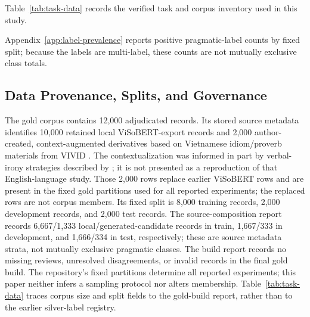 Table~\ref{tab:task-data} records the verified task and corpus inventory used in this study.
\begin{table}[t]
  \centering
  
  \caption{Verified ViPragSent task and data inventory.}
  \label{tab:task-data}
\end{table}
Appendix~\ref{app:label-prevalence} reports positive pragmatic-label counts by fixed split; because the labels are multi-label, these counts are not mutually exclusive class totals.

\subsection{Data Provenance, Splits, and Governance}

The gold corpus contains 12,000 adjudicated records.
Its stored source metadata identifies 10,000 retained local ViSoBERT-export records and 2,000 author-created, context-augmented derivatives based on Vietnamese idiom/proverb materials from VIVID \citep{rem-lab-2026-vivid}.  The contextualization was informed in part by verbal-irony strategies described by \citet{ghosh-etal-2020-interpreting}; it is not presented as a reproduction of that English-language study.
Those 2,000 rows replace earlier ViSoBERT rows and are present in the fixed gold partitions used for all reported experiments; the replaced rows are not corpus members.
Its fixed split is 8,000 training records, 2,000 development records, and 2,000 test records.
The source-composition report records 6,667/1,333 local/generated-candidate records in train, 1,667/333 in development, and 1,666/334 in test, respectively; these are source metadata strata, not mutually exclusive pragmatic classes.
The build report records no missing reviews, unresolved disagreements, or invalid records in the final gold build. The repository's fixed partitions determine all reported experiments; this paper neither infers a sampling protocol nor alters membership. Table~\ref{tab:task-data} traces corpus size and split fields to the gold-build report, rather than to the earlier silver-label registry.

